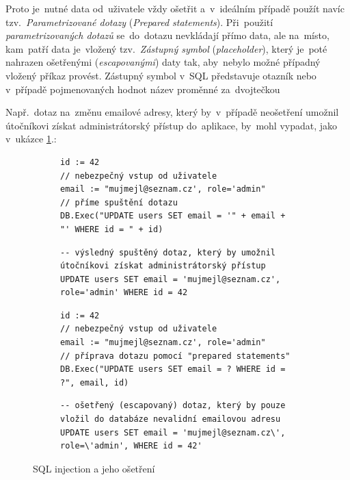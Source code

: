 \documentclass[11pt,a4paper]{report}
\begin{document}
                Proto je~nutné data od~uživatele vždy ošetřit a~v~ideálním případě použít navíc tzv.~\emph{Parametrizované dotazy} (\emph{Prepared statements}). Při~použití \emph{parametrizovaných dotazů} se~do~dotazu nevkládají přímo data, ale na~místo, kam~patří data je~vložený tzv.~\emph{Zástupný symbol} (\emph{placeholder}), který je~poté nahrazen ošetřenými (\emph{escapovanými}) daty tak, aby~nebylo možné případný vložený příkaz provést. Zástupný symbol v~SQL představuje otazník  nebo v~případě pojmenovaných hodnot název proměnné za~dvojtečkou  \cite{graham2021ethical}
                
                Např.~dotaz na~změnu emailové adresy, který by~v~případě neošetření umožnil útočníkovi získat administrátorský přístup do~aplikace, by~mohl vypadat, jako v~ukázce \ref{model-sql-injection}.:
                \begin{figure}
                    \begin{subfigure}{0.48\textwidth}
                        \centering
                        \begin{verbatim}
id := 42
// nebezpečný vstup od uživatele
email := "mujmejl@seznam.cz', role='admin"
// příme spuštění dotazu
DB.Exec("UPDATE users SET email = '" + email + "' WHERE id = " + id)
                        \end{verbatim}
                        \begin{verbatim}
-- výsledný spuštěný dotaz, který by umožnil útočníkovi získat administrátorský přístup
UPDATE users SET email = 'mujmejl@seznam.cz', role='admin' WHERE id = 42
                        \end{verbatim}
                    \end{subfigure}
                    \begin{subfigure}{0.48\textwidth}
                        \centering
                        \begin{verbatim}
id := 42
// nebezpečný vstup od uživatele
email := "mujmejl@seznam.cz', role='admin"
// příprava dotazu pomocí "prepared statements"
DB.Exec("UPDATE users SET email = ? WHERE id = ?", email, id)
                        \end{verbatim}
                        \begin{verbatim}
-- ošetřený (escapovaný) dotaz, který by pouze vložil do databáze nevalidní emailovou adresu
UPDATE users SET email = 'mujmejl@seznam.cz\', role=\'admin', WHERE id = 42'
                        \end{verbatim}
                    \end{subfigure}

                    \caption{SQL injection a jeho ošetření}
                    \label{model-sql-injection}
                \end{figure}
\end{document}
